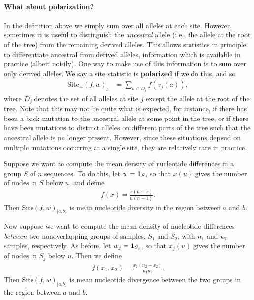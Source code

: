 \documentclass{article}
\newcommand{\site}{\mbox{Site}} %
\newcommand{\sitep}{\mbox{Site}_+} %
\newcommand{\iw}{w} %
\newcommand{\nw}{x} %
\newcommand{\aw}{{\bar x}} %
\begin{document}
\paragraph{What about polarization?}
In the definition above we simply sum over all alleles at each site.
However, sometimes it is useful to distinguish the \emph{ancestral} allele
(i.e., the allele at the root of the tree) from the remaining derived alleles.
This allows statistics in principle to differentiate ancestral from derived alleles,
information which is available in practice (albeit noisily).
One way to make use of this information is to sum over only derived alleles.
We say a site statistic is \textbf{polarized} if we do this,
and so
\begin{align} \label{eqn:site_unpolarized}
    \sitep(f, \iw)_j
    &=
    \sum_{a \in D_j} f(\aw_j(a)) ,
\end{align}
where $D_j$ denotes the set of all alleles at site $j$ except the allele at the root of the tree.
Note that this may not be quite what is expected,
for instance, if there has been a back mutation to the ancestral allele at some point in the tree,
or if there have been mutations to distinct alleles on different parts of the tree
such that the ancestral allele is no longer present.
However, since these situations depend on multiple mutations occurring at a single site,
they are relatively rare in practice.

\begin{example} \label{ex:site_diversity}
    Suppose we want to compute the mean density of nucleotide differences
    in a group $S$ of $n$ sequences.
    To do this,
    let $\iw = \bone_S$,
    so that $\nw(u)$ gives the number of nodes in $S$ below $u$,
    and define
    \begin{align*}
        f(x) = \frac{x (n - x)}{n (n-1)} .
    \end{align*}
    Then $\site(f, \iw)_{[a,b)}$ is mean nucleotide diversity in the region between $a$ and $b$.
\end{example}

\begin{example} \label{ex:site_divergence}
    Now suppose we want to compute the mean density of nucleotide differences
    \emph{between} two nonoverlapping groups of samples, $S_1$ and $S_2$,
    with $n_1$ and $n_2$ samples, respectively.
    As before,
    let $\iw_j = \bone_{S_j}$,
    so that $\nw_{j}(u)$ gives the number of nodes in $S_j$ below $u$.
    Then we define
    \begin{align*}
        f(x_1, x_2) = \frac{x_1 (n_2 - x_2)}{n_1 n_2} .
    \end{align*}
    Then $\site(f, \iw)_{[a,b)}$ is mean nucleotide divergence between the two groups
    in the region between $a$ and $b$.
\end{example}
\end{document}

